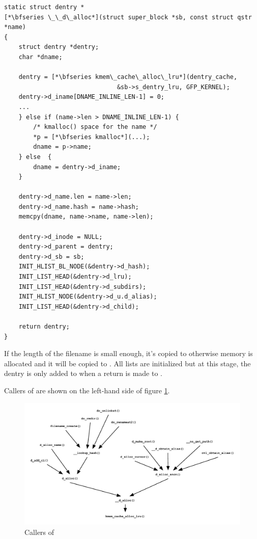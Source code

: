 \begin{lstlisting}
static struct dentry *
[*\bfseries \_\_d\_alloc*](struct super_block *sb, const struct qstr *name)
{
    struct dentry *dentry;
    char *dname;
        
    dentry = [*\bfseries kmem\_cache\_alloc\_lru*](dentry_cache, 
                               &sb->s_dentry_lru, GFP_KERNEL);
    dentry->d_iname[DNAME_INLINE_LEN-1] = 0;
    ...
    } else if (name->len > DNAME_INLINE_LEN-1) {
        /* kmalloc() space for the name */
        *p = [*\bfseries kmalloc*](...);
        dname = p->name;
    } else  {
        dname = dentry->d_iname;
    }
   
    dentry->d_name.len = name->len;
    dentry->d_name.hash = name->hash;
    memcpy(dname, name->name, name->len);

    dentry->d_inode = NULL;
    dentry->d_parent = dentry;
    dentry->d_sb = sb;
    INIT_HLIST_BL_NODE(&dentry->d_hash);
    INIT_LIST_HEAD(&dentry->d_lru);
    INIT_LIST_HEAD(&dentry->d_subdirs);
    INIT_HLIST_NODE(&dentry->d_u.d_alias);
    INIT_LIST_HEAD(&dentry->d_child);

    return dentry;
}
\end{lstlisting}

\noindent
If the length of the filename is small enough, it's copied to  otherwise memory is allocated and it will be copied to . All lists are initialized but at this stage, the dentry is only added to  when a return is made to .

Callers of  are shown on the left-hand side of figure \ref{fig:d-alloc}.

\begin{figure}[h]
	\includegraphics[scale=0.7]{figures/d-alloc.pdf}
	\centering
	\caption{Callers of }
	\label{fig:d-alloc}
\end{figure}


